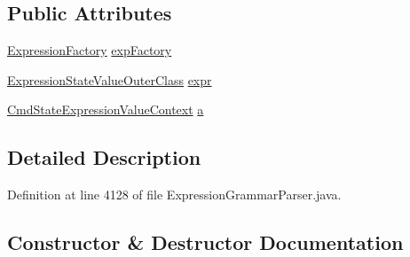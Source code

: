 \subsection*{Public Attributes}
\begin{DoxyCompactItemize}
\item 
\hyperlink{classgov_1_1nasa_1_1jpf_1_1inspector_1_1server_1_1expression_1_1_expression_factory}{Expression\+Factory} \hyperlink{classgov_1_1nasa_1_1jpf_1_1inspector_1_1server_1_1expression_1_1parser_1_1_expression_grammar_paa97aac802c11881ff9166c765f4fc61a_af24a19c5858a26b193e92d9fdced78c4}{exp\+Factory}
\item 
\hyperlink{classgov_1_1nasa_1_1jpf_1_1inspector_1_1server_1_1expression_1_1expressions_1_1_expression_state_value_outer_class}{Expression\+State\+Value\+Outer\+Class} \hyperlink{classgov_1_1nasa_1_1jpf_1_1inspector_1_1server_1_1expression_1_1parser_1_1_expression_grammar_paa97aac802c11881ff9166c765f4fc61a_a5dccb674202c015b6d0473cf09c8b0e5}{expr}
\item 
\hyperlink{classgov_1_1nasa_1_1jpf_1_1inspector_1_1server_1_1expression_1_1parser_1_1_expression_grammar_pa17ff9e538e96e94398ba5af02b5ffa30}{Cmd\+State\+Expression\+Value\+Context} \hyperlink{classgov_1_1nasa_1_1jpf_1_1inspector_1_1server_1_1expression_1_1parser_1_1_expression_grammar_paa97aac802c11881ff9166c765f4fc61a_a72b3abcce091b68c931500cd1fb1fc78}{a}
\end{DoxyCompactItemize}


\subsection{Detailed Description}


Definition at line 4128 of file Expression\+Grammar\+Parser.\+java.



\subsection{Constructor \& Destructor Documentation}
